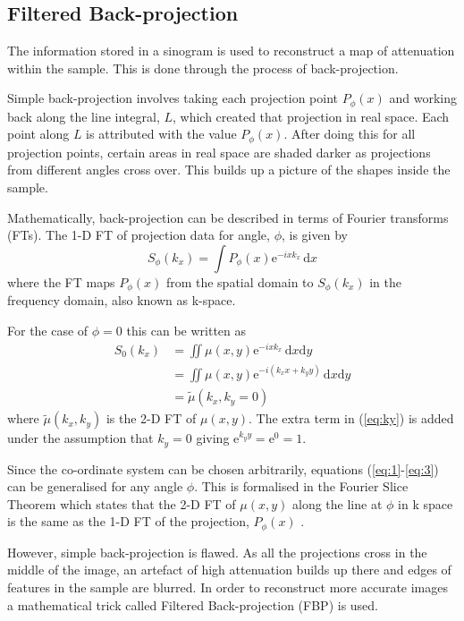 \subsection{Filtered Back-projection}
\label{subsec:FBP}

The information stored in a sinogram is used to reconstruct a map of attenuation within the sample. This is done through the process of back-projection.

Simple back-projection involves  taking each projection point $P_{\phi}(x)$ and working back along the line integral, $L$, which created that projection in real space. Each point along $L$ is  attributed with the value $P_{\phi}(x)$. After doing this for all projection points, certain areas in real space are shaded darker as projections from different angles cross over. This builds up a picture of the shapes inside the sample. 

Mathematically, back-projection can be described in terms of Fourier transforms (FTs). The 1-D FT of projection data for  angle, $\phi$, is given by
\begin{equation}
S_{\phi}(k_x) = \int P_{\phi}(x)\mathrm{e}^{-i x k_x}\, \mathrm{d}x
\end{equation}
where the FT maps $P_{\phi}(x)$ from the spatial domain to $S_{\phi}(k_x)$ in the frequency domain, also known as k-space.

For the case of $\phi = 0$ this can  be written as
\begin{align}
S_{0}(k_x) &= \iint \mu(x,y) \mathrm{e}^{-i x k_x }\, \mathrm{d}x\mathrm{d}y \label{eq:1}\\
  &= \iint \mu(x,y) \mathrm{e}^{-i(k_xx +k_yy)}\, \mathrm{d}x\mathrm{d}y \label{eq:ky} \\ 
  &= \tilde{\mu}(k_x,k_y=0) \label{eq:3}
\end{align}
where $\tilde{\mu}(k_x,k_y)$ is the 2-D FT of $\mu(x,y)$.
The extra term in (\ref{eq:ky}) is added  under the assumption that $k_y = 0$ giving $\mathrm{e}^{k_yy}=\mathrm{e}^{0}=1$. 

Since the co-ordinate system can be chosen arbitrarily, equations (\ref{eq:1}-\ref{eq:3}) can be generalised for any angle $\phi$.
This  is formalised in the Fourier Slice Theorem which states that the 2-D FT of $\mu(x,y)$ along the line at $\phi$ in k space is the same as the 1-D FT of the projection, $P_{\phi}(x)$ \cite{Doran:2008kh}.

However, simple back-projection is flawed. As all the projections cross in the middle of the image, an artefact of high attenuation builds up there and edges of features in the sample are blurred.  In order to reconstruct more accurate images a mathematical trick called Filtered Back-projection (FBP) is used. 


